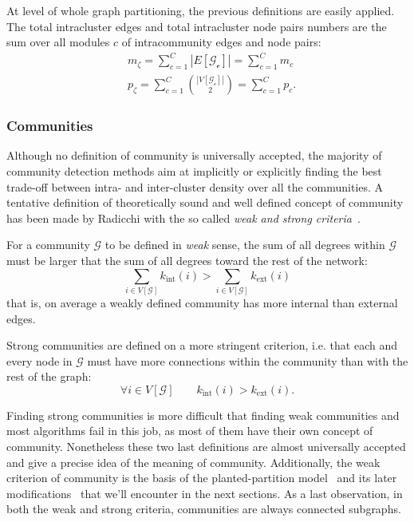 \noindent At level of whole graph partitioning, the previous definitions are easily applied. The total intracluster edges and total intracluster node pairs numbers are the sum over all modules $c$ of intracommunity edges and node pairs:
\begin{align}
&m_\zeta= \sum \limits_{c=1}^C |E[\mathcal{G_c}]| = \sum \limits_{c=1}^C m_c \\
&p_\zeta= \sum \limits_{c=1}^C \binom{|V[\mathcal{G_c}]|}{2} = \sum \limits_{c=1}^C p_c.
\end{align}

\subsubsection{Communities}
Although no definition of community is universally accepted, the majority of community detection methods aim at implicitly or explicitly finding the best trade-off between intra- and inter-cluster density over all the communities.
A tentative definition of theoretically sound and well defined concept of community has been made by Radicchi with the so called \emph{weak and strong criteria}~\cite{radicchi2004}.

For a community $\mathcal{G}$ to be defined in \emph{weak} sense, the sum of all degrees within $\mathcal{G}$ must be larger that the sum of all degrees toward the rest of the network:
\begin{equation}\label{eq:communityweak}
\sum \limits_{i \in V[\mathcal{G}]} k_{\textrm{int}}(i) > \sum \limits_{i \in V[\mathcal{G}]} k_{\textrm{ext}}(i)
\end{equation}
that is, on average a weakly defined community has more internal than external edges.

Strong communities are defined on a more stringent criterion, i.e. that each and every node in $\mathcal{G}$ must have more connections within the community than with the rest of the graph:
\begin{equation}
\forall i \in V[\mathcal{G}] \qquad k_{\textrm{int}}(i) > k_{\textrm{ext}}(i).
\end{equation}

Finding strong communities is more difficult that finding weak communities and most algorithms fail in this job, as most of them have their own concept of community. Nonetheless these two last definitions are almost universally accepted and give a precise idea of the meaning of community. Additionally, the weak criterion of community is the basis of the planted-partition model~\cite{condon2000} and its later modifications~\cite{lancichinetti2008} that we'll encounter in the next sections. As a last observation, in both the weak and strong criteria, communities are always connected subgraphs.

